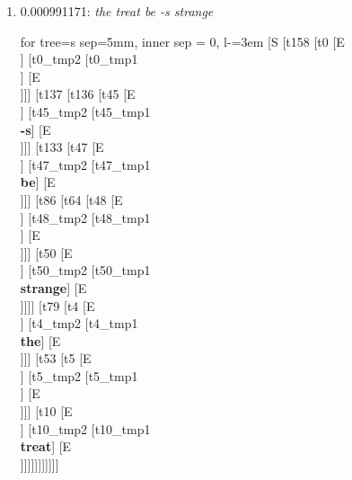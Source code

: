 \documentclass[11pt]{article}
\begin{document}
\begin{enumerate}
	\item  0.000991171: \textit{the treat be -s strange} \\[0.5em]
	\begin{forest}
	for tree={s sep=5mm, inner sep = 0, l-=3em}
	[S [t158 [t0 [E\\ ] [t0_tmp2 [t0_tmp1\\ ] [E\\ ]]] [t137 [t136 [t45 [E\\ ] [t45_tmp2 [t45_tmp1\\\textbf{-s}] [E\\ ]]] [t133 [t47 [E\\ ] [t47_tmp2 [t47_tmp1\\\textbf{be}] [E\\ ]]] [t86 [t64 [t48 [E\\ ] [t48_tmp2 [t48_tmp1\\ ] [E\\ ]]] [t50 [E\\ ] [t50_tmp2 [t50_tmp1\\\textbf{strange}] [E\\ ]]]] [t79 [t4 [E\\ ] [t4_tmp2 [t4_tmp1\\\textbf{the}] [E\\ ]]] [t53 [t5 [E\\ ] [t5_tmp2 [t5_tmp1\\ ] [E\\ ]]] [t10 [E\\ ] [t10_tmp2 [t10_tmp1\\\textbf{treat}] [E\\ ]]]]]]]]]]]
	\end{forest}
	\newpage

\end{enumerate}
\end{document}
